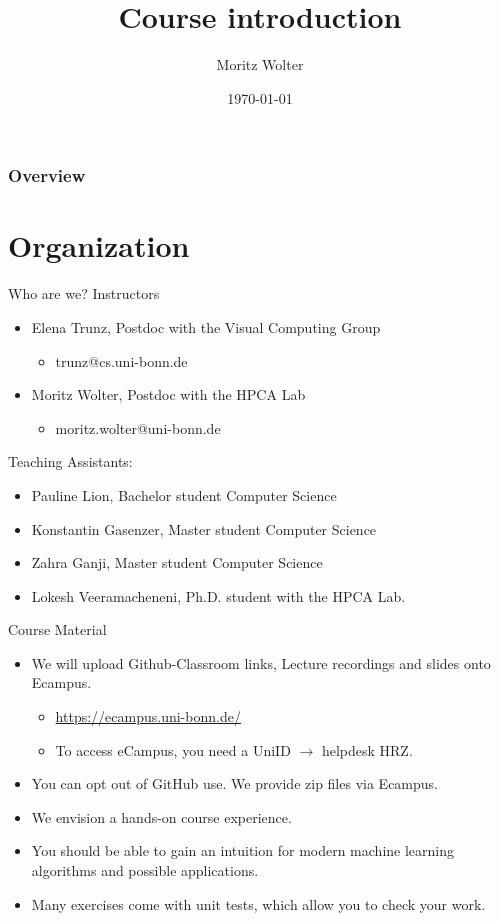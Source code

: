 \documentclass{beamer}
\title{Course introduction}
\date{\today}
\institute{High-Performance Computing and Analytics Lab, Universität Bonn}
\author{Moritz Wolter}
\begin{document}
    \maketitle

    \begin{frame}
    \frametitle{Overview} 
    \tableofcontents
    \end{frame}

    \section{Organization}
    \begin{frame}{Who are we?}
      Instructors
      \begin{itemize}
        \item Elena Trunz, Postdoc with the Visual Computing Group
        \begin{itemize}
          \item trunz@cs.uni-bonn.de
        \end{itemize}
        \item Moritz Wolter, Postdoc with the HPCA Lab
        \begin{itemize}
          \item moritz.wolter@uni-bonn.de
        \end{itemize}
      \end{itemize}
      Teaching Assistants:
      \begin{itemize}
        \item Pauline Lion, Bachelor student Computer Science
        \item Konstantin Gasenzer, Master student Computer Science
        \item Zahra Ganji, Master student Computer Science
        \item Lokesh Veeramacheneni, Ph.D. student with the HPCA Lab.
      \end{itemize}
    \end{frame}

    \begin{frame}{Course Material}
      \begin{itemize}
        \item  We will upload Github-Classroom links, 
               Lecture recordings and slides onto Ecampus.
        \begin{itemize}
          \item \url{https://ecampus.uni-bonn.de/}
          \item To access eCampus, you need a UniID $\rightarrow$ helpdesk HRZ.
        \end{itemize}
        \item You can opt out of GitHub use. We provide zip files via Ecampus.
        \item We envision a hands-on course experience.
        \item You should be able to gain an intuition
              for modern machine learning algorithms and possible applications.
        \item Many exercises come with unit tests, which allow you to check your work.
      \end{itemize}
    \end{frame}
\end{document}
